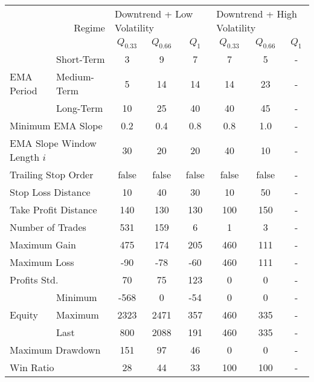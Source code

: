 \centering
\begin{tabular}{ll|cccccc}
    \toprule
    \multicolumn{2}{r|}{\multirow{2}{*}{Regime}} & \multicolumn{3}{l}{Downtrend + Low Volatility}   & \multicolumn{3}{l}{Downtrend + High Volatility}   \\
    \multicolumn{2}{r|}{} & $Q_{0.33}$ & $Q_{0.66}$ & $Q_{1}$ & $Q_{0.33}$ & $Q_{0.66}$ & $Q_{1}$ \\
    \midrule
    \multirow{3}{*}{EMA Period} & Short-Term  & 3    & 9    & 7   & 7   & 5   & - \\
    & Medium-Term & 5    & 14   & 14  & 14  & 23  & - \\
    & Long-Term   & 10   & 25   & 40  & 40  & 45  & - \\
    \multicolumn{2}{l|}{Minimum EMA Slope} & 0.2 & 0.4 & 0.8 & 0.8 & 1.0 & - \\
    \multicolumn{2}{l|}{EMA Slope Window Length $i$} & 30 & 20 & 20 & 40 & 10 & - \\
    \multicolumn{2}{l|}{Trailing Stop Order} & false & false & false & false & false & - \\
    \multicolumn{2}{l|}{Stop Loss Distance} & 10 & 40 & 30 & 10 & 50 & - \\
    \multicolumn{2}{l|}{Take Profit Distance} & 140 & 130 & 130 & 100 & 150 & - \\
    \midrule
    \multicolumn{2}{l|}{Number of Trades} & 531 & 159 & 6 & 1 & 3 & - \\
    \multicolumn{2}{l|}{Maximum Gain} & 475 & 174 & 205 & 460 & 111 & - \\
    \multicolumn{2}{l|}{Maximum Loss} & -90 & -78 & -60 & 460 & 111 & - \\
    \multicolumn{2}{l|}{Profits Std.} & 70 & 75 & 123 & 0 & 0 & - \\
    \multirow{3}{*}{Equity}     & Minimum     & -568 & 0    & -54 & 0   & 0   & - \\
    & Maximum     & 2323 & 2471 & 357 & 460 & 335 & - \\
    & Last        & 800  & 2088 & 191 & 460 & 335 & - \\
    \multicolumn{2}{l|}{Maximum Drawdown} & 151 & 97 & 46 & 0 & 0 & - \\
    \multicolumn{2}{l|}{Win Ratio} & 28 & 44 & 33 & 100 & 100 & - \\
    \bottomrule
\end{tabular}